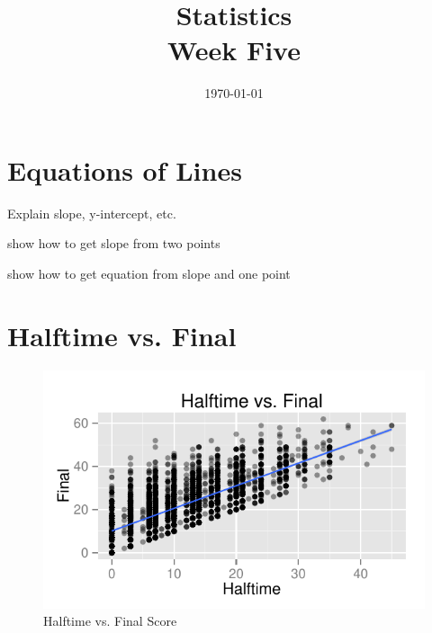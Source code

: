 \documentclass[letterpaper, landscape]{exam}
\title{Statistics \\ Week Five}
\date{\today}
\author{}
\begin{document}
\maketitle
\tableofcontents

  \section{Equations of Lines}
  \begin{itemize*}
    \item Explain slope, y-intercept, etc.
    \item show how to get slope from two points
    \item show how to get equation from slope and one point
  \end{itemize*}

  \section{Halftime vs. Final}

  \begin{figure}[H]
    \centering
    \includegraphics{figures/nfl/ht_vs_final.pdf}
    \caption{Halftime vs. Final Score}
  \end{figure}

\end{document}

